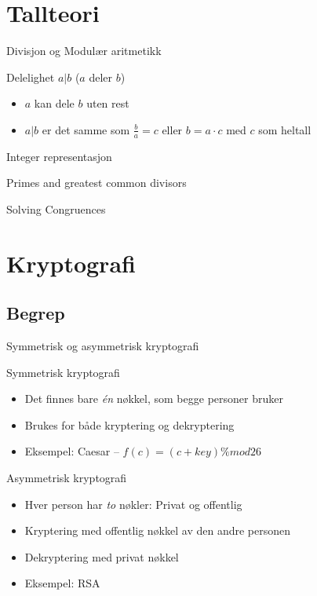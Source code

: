 \section{Tallteori}
\begin{frame}{Divisjon og Modulær aritmetikk}
\begin{block}{Delelighet $a|b$ ($a$ deler $b$)}
\begin{itemize}
\item $a$ kan dele $b$ uten rest
\item $a|b$ er det samme som $\frac{b}{a}=c$ eller $b=a\cdot c$ med $c$ som heltall
\end{itemize}
\end{block}
\end{frame}

\begin{frame}
Integer representasjon
\end{frame}

\begin{frame}
Primes and greatest common divisors
\end{frame}

\begin{frame}
Solving Congruences
\end{frame}


\section{Kryptografi}
\subsection*{Begrep}
\begin{frame}{Symmetrisk og asymmetrisk kryptografi}
\begin{block}{Symmetrisk kryptografi}
\begin{itemize}
\item Det finnes bare \textit{én} nøkkel, som begge personer bruker
\item Brukes for både kryptering og dekryptering
\item Eksempel: Caesar – $f(c) = (c+key) \% mod 26$
\end{itemize}
\end{block}
\begin{block}{Asymmetrisk kryptografi}
\begin{itemize}
\item Hver person har \textit{to} nøkler: Privat og offentlig
\item Kryptering med offentlig nøkkel av den andre personen
\item Dekryptering med privat nøkkel
\item Eksempel: RSA
\end{itemize}
\end{block}
\end{frame}

